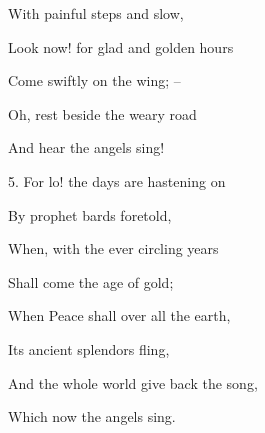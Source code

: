\begin{description}[nosep,leftmargin=\parindent,labelsep=0pt]
\item With painful steps and slow, 
\item Look now! for glad and golden hours 
\item Come swiftly on the wing; – 
\item Oh, rest beside the weary road 
\item And hear the angels sing! 
\vspace{1.5ex}
\item 5. For lo! the days are hastening on 
\item By prophet bards foretold, 
\item When, with the ever circling years 
\item Shall come the age of gold; 
\item When Peace shall over all the earth, 
\item Its ancient splendors fling, 
\item And the whole world give back the song, 
\item Which now the angels sing. 
\end{description}
